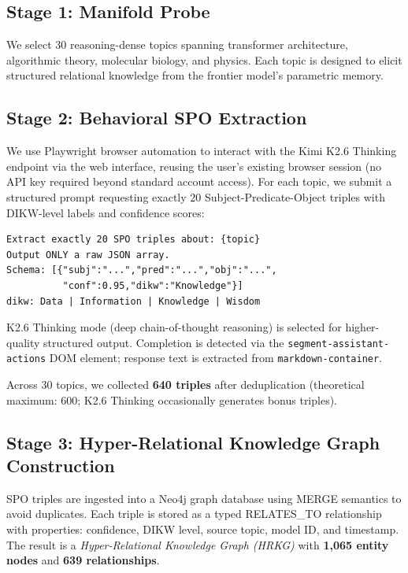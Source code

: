 \documentclass[11pt]{article}
\begin{document}
\subsection{Stage 1: Manifold Probe}
We select 30 reasoning-dense topics spanning transformer architecture,
algorithmic theory, molecular biology, and physics.
Each topic is designed to elicit structured relational knowledge from the
frontier model's parametric memory.

\subsection{Stage 2: Behavioral SPO Extraction}
\label{sec:stage2}
We use Playwright browser automation to interact with the Kimi K2.6 Thinking
endpoint via the web interface, reusing the user's existing browser session
(no API key required beyond standard account access).
For each topic, we submit a structured prompt requesting exactly 20
Subject-Predicate-Object triples with DIKW-level labels and confidence scores:

\begin{lstlisting}[basicstyle=\small\ttfamily, frame=single]
Extract exactly 20 SPO triples about: {topic}
Output ONLY a raw JSON array.
Schema: [{"subj":"...","pred":"...","obj":"...",
          "conf":0.95,"dikw":"Knowledge"}]
dikw: Data | Information | Knowledge | Wisdom
\end{lstlisting}

K2.6 Thinking mode (deep chain-of-thought reasoning) is selected for
higher-quality structured output.
Completion is detected via the \texttt{segment-assistant-actions} DOM
element; response text is extracted from \texttt{markdown-container}.

Across 30 topics, we collected \textbf{640 triples} after deduplication
(theoretical maximum: 600; K2.6 Thinking occasionally generates bonus triples).

\subsection{Stage 3: Hyper-Relational Knowledge Graph Construction}
SPO triples are ingested into a Neo4j graph database using MERGE semantics
to avoid duplicates.
Each triple is stored as a typed RELATES\_TO relationship with properties:
confidence, DIKW level, source topic, model ID, and timestamp.
The result is a \emph{Hyper-Relational Knowledge Graph (HRKG)} with
\textbf{1,065 entity nodes} and \textbf{639 relationships}.
\end{document}
